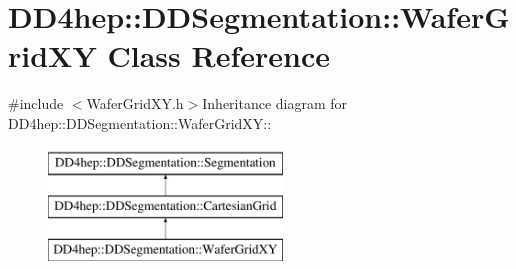 \hypertarget{class_d_d4hep_1_1_d_d_segmentation_1_1_wafer_grid_x_y}{
\section{DD4hep::DDSegmentation::WaferGridXY Class Reference}
\label{class_d_d4hep_1_1_d_d_segmentation_1_1_wafer_grid_x_y}
}


{\ttfamily \#include $<$WaferGridXY.h$>$}Inheritance diagram for DD4hep::DDSegmentation::WaferGridXY::\begin{figure}[H]
\begin{center}
\leavevmode
\includegraphics[height=3cm]{class_d_d4hep_1_1_d_d_segmentation_1_1_wafer_grid_x_y}
\end{center}
\end{figure}
